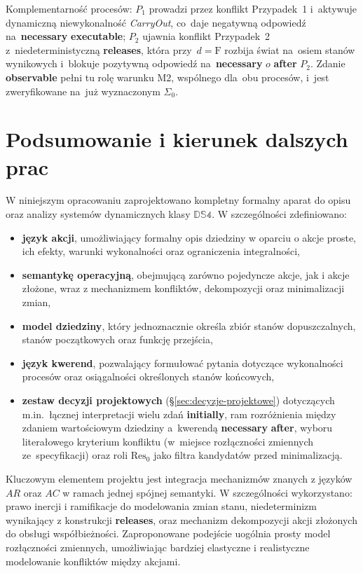 \documentclass[11pt,a4paper]{article}
\newcommand{\aft}{\textbf{after}}
\newcommand{\initially}{\textbf{initially}}
\newcommand{\releases}{\textbf{releases}}
\newcommand{\observable}{\textbf{observable}}
\newcommand{\necessary}{\textbf{necessary}}
\newcommand{\executable}{\textbf{executable}}
\theoremstyle{definition}
\begin{document}
\medskip
\noindent Komplementarność procesów: $P_1$ prowadzi przez konflikt Przypadek~1
i~aktywuje dynamiczną niewykonalność \textit{CarryOut}, co~daje negatywną
odpowiedź na~\necessary{} \executable{}; $P_2$ ujawnia konflikt Przypadek~2
z~niedeterministyczną \releases{}, która przy~$d = \text{F}$ rozbija świat
na~osiem stanów wynikowych i~blokuje pozytywną odpowiedź na~\necessary{} $o$
\aft{} $P_2$. Zdanie \observable{} pełni tu rolę warunku M2, wspólnego
dla~obu procesów, i~jest zweryfikowane na~już wyznaczonym $\Sigma_0$.

\section{Podsumowanie i kierunek dalszych prac}

W niniejszym opracowaniu zaprojektowano kompletny formalny aparat do opisu oraz analizy systemów dynamicznych klasy $\mathbb{DS4}$. W szczególności zdefiniowano:

\begin{itemize}
    \item \textbf{język akcji}, umożliwiający formalny opis dziedziny w oparciu o akcje proste, ich efekty, warunki wykonalności oraz ograniczenia integralności,
    \item \textbf{semantykę operacyjną}, obejmującą zarówno pojedyncze akcje, jak i akcje złożone, wraz z mechanizmem konfliktów, dekompozycji oraz minimalizacji zmian,
    \item \textbf{model dziedziny}, który jednoznacznie określa zbiór stanów dopuszczalnych, stanów początkowych oraz funkcję przejścia,
    \item \textbf{język kwerend}, pozwalający formułować pytania dotyczące wykonalności procesów oraz osiągalności określonych stanów końcowych,
    \item \textbf{zestaw decyzji projektowych} (§\ref{sec:decyzje-projektowe}) dotyczących m.in.\ łącznej interpretacji wielu zdań \initially{}, ram rozróżnienia między zdaniem wartościowym dziedziny a~kwerendą \necessary{} \aft{}, wyboru literałowego kryterium konfliktu (w~miejsce rozłączności zmiennych ze~specyfikacji) oraz roli $\mathrm{Res}_0$ jako filtra kandydatów przed minimalizacją.
\end{itemize}

Kluczowym elementem projektu jest integracja mechanizmów znanych z języków $AR$ oraz $AC$ w ramach jednej spójnej semantyki. W szczególności wykorzystano:
prawo inercji i ramifikacje do modelowania zmian stanu,
niedeterminizm wynikający z konstrukcji \textbf{releases},
oraz mechanizm dekompozycji akcji złożonych do obsługi współbieżności.
Zaproponowane podejście uogólnia prosty model rozłączności zmiennych, umożliwiając bardziej elastyczne i realistyczne modelowanie konfliktów między akcjami.
\end{document}

